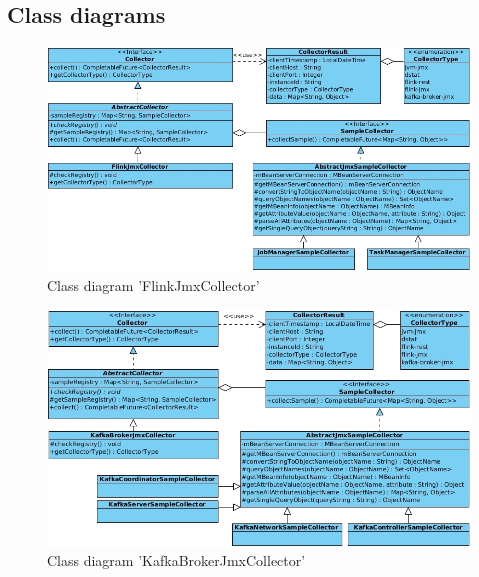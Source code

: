 \subsection{Class diagrams}
\begin{figure}[H]
	\centering
	\includegraphics[width=1.0\textwidth]{../uml/class-flink-jmx-collector.jpg}
	\caption{Class diagram 'FlinkJmxCollector'}
	\label{class-diagram-flink-jmx-collector}
\end{figure}
\begin{figure}[H]
	\centering
	\includegraphics[width=1.0\textwidth]{../uml/class-kafka-broker-jmx-collector.jpg}
	\caption{Class diagram 'KafkaBrokerJmxCollector'}
	\label{class-diagram-kafka-broker-jmx-collector}
\end{figure}
